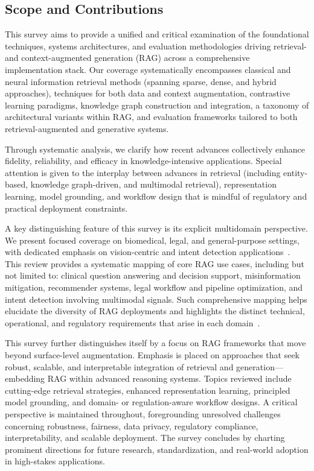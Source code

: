 \documentclass[sigconf]{acmart}
\begin{document}
\subsection{Scope and Contributions}

This survey aims to provide a unified and critical examination of the foundational techniques, systems architectures, and evaluation methodologies driving retrieval- and context-augmented generation (RAG) across a comprehensive implementation stack. Our coverage systematically encompasses classical and neural information retrieval methods (spanning sparse, dense, and hybrid approaches), techniques for both data and context augmentation, contrastive learning paradigms, knowledge graph construction and integration, a taxonomy of architectural variants within RAG, and evaluation frameworks tailored to both retrieval-augmented and generative systems.

Through systematic analysis, we clarify how recent advances collectively enhance fidelity, reliability, and efficacy in knowledge-intensive applications. Special attention is given to the interplay between advances in retrieval (including entity-based, knowledge graph-driven, and multimodal retrieval), representation learning, model grounding, and workflow design that is mindful of regulatory and practical deployment constraints.

A key distinguishing feature of this survey is its explicit multidomain perspective. We present focused coverage on biomedical, legal, and general-purpose settings, with dedicated emphasis on vision-centric and intent detection applications~\cite{ref1, ref2, ref3, ref4, ref5, ref6, ref7, ref8, ref29, ref30, ref31, ref42, ref48, ref51, ref52, ref53, ref54, ref55, ref61, ref62, ref63, ref64}. This review provides a systematic mapping of core RAG use cases, including but not limited to: clinical question answering and decision support, misinformation mitigation, recommender systems, legal workflow and pipeline optimization, and intent detection involving multimodal signals. Such comprehensive mapping helps elucidate the diversity of RAG deployments and highlights the distinct technical, operational, and regulatory requirements that arise in each domain~\cite{ref1, ref2, ref3, ref5, ref6, ref7, ref8, ref29, ref30, ref31, ref42, ref48, ref51, ref52, ref53, ref54, ref55, ref63}.

This survey further distinguishes itself by a focus on RAG frameworks that move beyond surface-level augmentation. Emphasis is placed on approaches that seek robust, scalable, and interpretable integration of retrieval and generation---embedding RAG within advanced reasoning systems. Topics reviewed include cutting-edge retrieval strategies, enhanced representation learning, principled model grounding, and domain- or regulation-aware workflow designs. A critical perspective is maintained throughout, foregrounding unresolved challenges concerning robustness, fairness, data privacy, regulatory compliance, interpretability, and scalable deployment. The survey concludes by charting prominent directions for future research, standardization, and real-world adoption in high-stakes applications.
\end{document}
